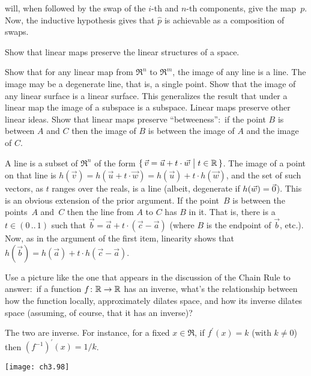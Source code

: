 \begin{exercises}
\begin{answer}
\begin{equation*}
      \end{equation*}
      will, when followed by the swap of the $i$-th and $n$-th components, 
      give the map~$p$.
      Now, the inductive hypothesis gives that $\hat{p}$ is achievable as 
      a composition of swaps.
    \end{answer}
  \item \label{exer:ImageLinSurIsLinSur} 
    Show that linear maps preserve the linear structures of a space.
    \begin{exparts}
      \partsitem Show that for any linear map from $\Re^n$ to $\Re^m$,
         the image of any line is a line.
         The image may be a degenerate line, that is, a single point.
      \partsitem Show that the image of any linear surface is a linear surface.
         This generalizes the result that under a linear map the image of
         a subspace is a subspace.
      \partsitem Linear maps preserve other linear ideas.
         Show that linear maps preserve ``betweeness'':~if the point
         $B$ is between $A$ and $C$ then the image of $B$ is between the
         image of $A$ and the image of $C$.
    \end{exparts}
    \begin{answer}
      \begin{exparts}
        \partsitem A line is a subset of $\Re^n$ of the form
          $\mbox{$\{\,\vec{v}=\vec{u}+t\cdot\vec{w}\bigm| t\in\mathbb{R}\,\}$}$.
          The image of a point on that line is 
          $h(\vec{v})=h(\vec{u}+t\cdot\vec{w})=h(\vec{u})+t\cdot h(\vec{w})$,
          and the set of such vectors, as $t$ ranges over the reals, is
          a line (albeit, degenerate if $h(\vec{w})=\vec{0}$).
        \partsitem This is an obvious extension of the prior argument.
        \partsitem If the point~$B$ is between the points~$A$ and~$C$ then the
          line from $A$ to $C$ has $B$ in it.
          That is, there is a $t\in (0\,..\,1)$ such that
          $\vec{b}=\vec{a}+t\cdot (\vec{c}-\vec{a})$ (where $B$ is the
          endpoint of $\vec{b}$, etc.).
          Now, as in the argument of the first item, linearity shows that
          $h(\vec{b})=h(\vec{a})+t\cdot h(\vec{c}-\vec{a})$.  
      \end{exparts}
    \end{answer}
  \item 
    Use a picture like the one 
    that appears in the discussion of the Chain Rule
    to answer:~if a function $\mbox{$f\colon \mathbb{R}\to \mathbb{R}$}$ has an inverse,
    what's the relationship between how the function \Dash locally, 
    approximately \Dash  dilates space, and
    how its inverse dilates space (assuming, of course, that it has an 
    inverse)?
    \begin{answer}
      The two are inverse.
      For instance, for a fixed $x\in\Re$,
      if $f^\prime (x)=k$ (with $k\neq 0$) then 
      $(f^{-1})^\prime (x)=1/k$.
      \begin{center}
        \texttt{[image: ch3.98]}
     \end{center}
    \end{answer}
\end{exercises}
\endinput


